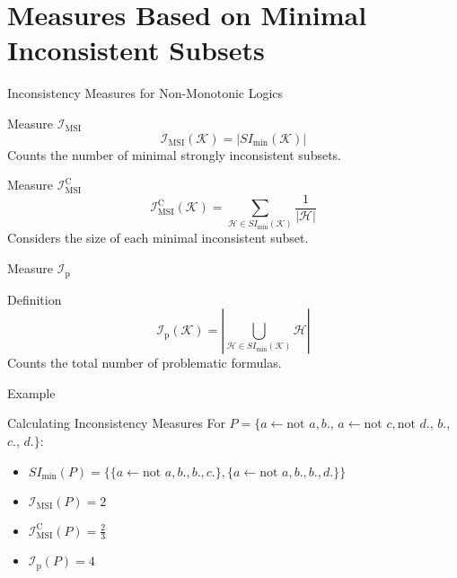 \section{Measures Based on Minimal Inconsistent Subsets}

\begin{frame}{Inconsistency Measures for Non-Monotonic Logics}
    \begin{block}{Measure $\mathcal{I}_{\text{MSI}}$}
        \[
            \mathcal{I}_{\text{MSI}}(\mathcal{K}) = \left| SI_{\min}(\mathcal{K}) \right|
        \]
        Counts the number of minimal strongly inconsistent subsets.
    \end{block}
    \begin{block}{Measure $\mathcal{I}_{\text{MSI}}^\text{C}$}
        \[
            \mathcal{I}_{\text{MSI}}^\text{C}(\mathcal{K}) = \sum_{\mathcal{H} \in SI_{\min}(\mathcal{K})} \frac{1}{|\mathcal{H}|}
        \]
        Considers the size of each minimal inconsistent subset.
    \end{block}
\end{frame}

\begin{frame}{Measure $\mathcal{I}_{\text{p}}$}
    \begin{block}{Definition}
        \[
            \mathcal{I}_{\text{p}}(\mathcal{K}) = \left| \bigcup_{\mathcal{H} \in SI_{\min}(\mathcal{K})} \mathcal{H} \right|
        \]
        Counts the total number of problematic formulas.
    \end{block}
\end{frame}

\begin{frame}{Example}
    \begin{exampleblock}{Calculating Inconsistency Measures}
        For $P = \{a \leftarrow \text{not } a, b.$, $a \leftarrow \text{not } c, \text{not } d.$, $b.$, $c.$, $d.\}$:

        \begin{itemize}
            \item $SI_{\min}(P) = \{\{a \leftarrow \text{not } a, b., b., c.\}, \{a \leftarrow \text{not } a, b., b., d.\}\}$
            \item $\mathcal{I}_{\text{MSI}}(P) = 2$
            \item $\mathcal{I}_{\text{MSI}}^\text{C}(P) = \frac{2}{3}$
            \item $\mathcal{I}_{\text{p}}(P) = 4$
        \end{itemize}
    \end{exampleblock}
\end{frame}


